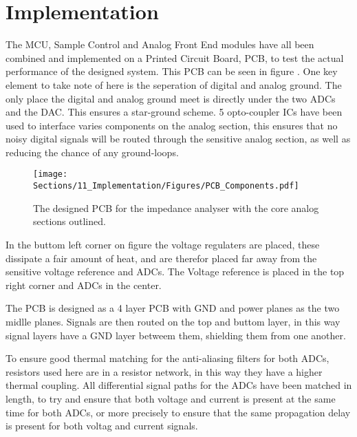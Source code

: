 \chapter{Implementation}\label{subsec:PCBDesign}
The MCU, Sample Control and Analog Front End modules have all been combined and implemented on a Printed Circuit Board, PCB, to test the actual performance of the designed system. This PCB can be seen in figure . One key element to take note of here is the seperation of digital and analog ground. The only place the digital and analog ground meet is directly under the two ADCs and the DAC. This ensures a star-ground scheme. 5 opto-coupler ICs have been used to interface varies components on the analog section, this ensures that no noisy digital signals will be routed through the sensitive analog section, as well as reducing the chance of any ground-loops. 

\begin{figure}[H]
   \centering
   \texttt{[image: Sections/11\_Implementation/Figures/PCB\_Components.pdf]}
   \caption{The designed PCB for the impedance analyser with the core analog sections outlined.}
   \label{fig_PCB}
\end{figure}

In the buttom left corner on figure  the voltage regulaters are placed, these dissipate a fair amount of heat, and are therefor placed far away from the sensitive voltage reference and ADCs. The Voltage reference is placed in the top right corner and ADCs in the center. 

The PCB is designed as a 4 layer PCB with GND and power planes as the two midlle planes. Signals are then routed on the top and buttom layer, in this way signal layers have a GND layer betweem them, shielding them from one another.

To ensure good thermal matching for the anti-aliasing filters for both ADCs, resistors used here are in a resistor network, in this way they have a higher thermal coupling. All differential signal paths for the ADCs have been matched in length, to try and ensure that both voltage and current is present at the same time for both ADCs, or more precisely to ensure that the same propagation delay is present for both voltag and current signals.
